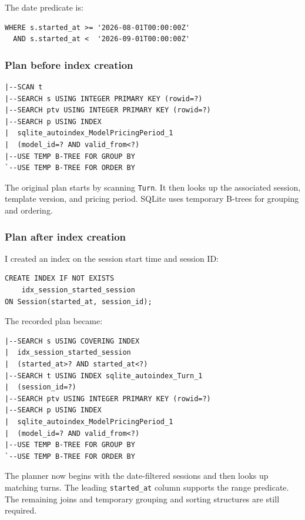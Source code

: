 \documentclass[11pt,a4paper]{article}
\begin{document}
The date predicate is:

\begin{lstlisting}[style=sqlstyle]
WHERE s.started_at >= '2026-08-01T00:00:00Z'
  AND s.started_at <  '2026-09-01T00:00:00Z'
\end{lstlisting}

\subsubsection{Plan before index creation}

\begin{lstlisting}[style=textstyle]
|--SCAN t
|--SEARCH s USING INTEGER PRIMARY KEY (rowid=?)
|--SEARCH ptv USING INTEGER PRIMARY KEY (rowid=?)
|--SEARCH p USING INDEX
|  sqlite_autoindex_ModelPricingPeriod_1
|  (model_id=? AND valid_from<?)
|--USE TEMP B-TREE FOR GROUP BY
`--USE TEMP B-TREE FOR ORDER BY
\end{lstlisting}

The original plan starts by scanning \texttt{Turn}. It then looks up
the associated session, template version, and pricing period. SQLite
uses temporary B-trees for grouping and ordering.

\subsubsection{Plan after index creation}

I created an index on the session start time and session ID:

\begin{lstlisting}[style=sqlstyle]
CREATE INDEX IF NOT EXISTS
    idx_session_started_session
ON Session(started_at, session_id);
\end{lstlisting}

The recorded plan became:

\begin{lstlisting}[style=textstyle]
|--SEARCH s USING COVERING INDEX
|  idx_session_started_session
|  (started_at>? AND started_at<?)
|--SEARCH t USING INDEX sqlite_autoindex_Turn_1
|  (session_id=?)
|--SEARCH ptv USING INTEGER PRIMARY KEY (rowid=?)
|--SEARCH p USING INDEX
|  sqlite_autoindex_ModelPricingPeriod_1
|  (model_id=? AND valid_from<?)
|--USE TEMP B-TREE FOR GROUP BY
`--USE TEMP B-TREE FOR ORDER BY
\end{lstlisting}

The planner now begins with the date-filtered sessions and then
looks up matching turns. The leading \texttt{started\_at} column
supports the range predicate. The remaining joins and temporary
grouping and sorting structures are still required.
\end{document}

